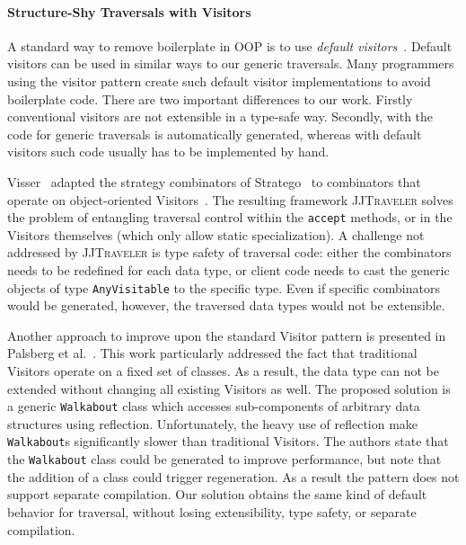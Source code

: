 \paragraph{Structure-Shy Traversals with Visitors}
A standard way to remove boilerplate in OOP is to use \emph{default
  visitors}~\cite{nordberg96variations}. Default visitors can be used
in similar ways to our generic traversals. Many programmers using
the visitor pattern create such default visitor implementations to
avoid boilerplate code. There are two important differences to
our work. Firstly conventional visitors are not extensible in a
type-safe way. Secondly, with \name the code for generic traversals
is automatically generated, whereas with default visitors such code
usually has to be implemented by hand.

Visser~\cite{visser01visitor} adapted the strategy combinators of Stratego~\cite{visser1998core,Visser:1998:BPO:289423.289425} to combinators that operate on object-oriented Visitors~\cite{gof}.
The resulting framework \textsc{JJTraveler} solves the problem of entangling traversal control within the \lstinline{accept} methods, or in the Visitors themselves (which only allow static specialization).
A challenge not addressed by \textsc{JJTraveler} is type safety of traversal code: either the combinators needs to be redefined for each data type, or client code needs to cast the generic objects of type \lstinline{AnyVisitable} to the specific type.
Even if specific combinators would be generated, however, the traversed data types would not be extensible.

Another approach to improve upon the standard Visitor pattern is presented in Palsberg et al.~\cite{palsberg98essence}.
This work particularly addressed the fact that traditional Visitors operate on a fixed set of classes. As a result, the data type can not be extended without changing all existing Visitors as well.
The proposed solution is a generic \lstinline{Walkabout} class which accesses sub-components of arbitrary data structures using reflection.
Unfortunately, the heavy use of reflection make \lstinline{Walkabout}s significantly slower than traditional Visitors.
The authors  state that the \lstinline{Walkabout} class could be generated to improve performance, but note that the addition of a class could trigger regeneration. As a result the pattern does not support separate compilation.
Our solution obtains the same kind of default behavior for traversal,  without losing extensibility, type safety, or separate compilation.

